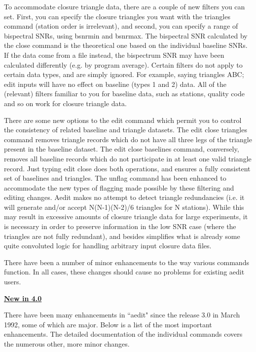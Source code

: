 \begin{center}
To accommodate closure triangle data, there are a couple of new filters you can 
set.  First, you can specify the closure triangles you want with the triangles 
command (station order is irrelevant), and second, you can specify a range of 
bispectral SNRs, using bsnrmin and bsnrmax.  The bispectral SNR calculated by 
the close command is the theoretical one based on the individual baseline SNRs.  
If the data come from a file instead, the bispectrum SNR may have been calculated 
differently (e.g. by program average).  Certain filters do not apply to certain data 
types, and are simply ignored.  For example, saying triangles ABC; edit inputs will 
have no effect on baseline (types 1 and 2) data.  All of the (relevant) filters 
familiar to you for baseline data, such as stations, quality code and so on work 
for closure triangle data.

There are some new options to the edit command which permit you to control the 
consistency of related baseline and triangle datasets.  The edit close triangles 
command removes triangle records which do not have all three legs of the triangle 
present in the baseline dataset.  The edit close baselines command, conversely, 
removes all baseline records which do not participate in at least one valid 
triangle record.  Just typing edit close does both operations, and ensures a 
fully consistent set of baselines and triangles.  The unflag command has been 
enhanced to accommodate the new types of flagging made possible by these filtering 
and editing changes.  Aedit makes no attempt to detect triangle redundancies 
(i.e. it will generate and/or accept N(N-1)(N-2)/6 triangles for N stations).  
While this may result in excessive amounts of closure triangle data for large 
experiments, it is necessary in order to preserve information in the low 
SNR case (where the triangles are not fully redundant), and besides simplifies 
what is already some quite convoluted logic for handling arbitrary input closure 
data files.

There have been a number of minor enhancements to the way various commands function.  
In all cases, these changes should cause no problems for existing aedit users.



\begin{center}
\large\bf
\underline{New in 4.0}
\end{center}

There have been many enhancements in ``aedit" since the release 3.0
in March 1992, some of which are major.  Below is a list of the most 
important enhancements.  The detailed documentation of the individual 
commands covers the numerous other, more minor changes.


\end{center}
